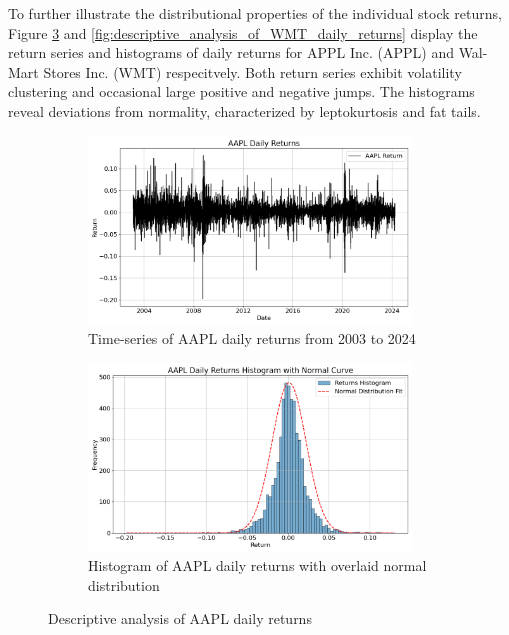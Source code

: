 To further illustrate the distributional properties of the individual stock returns, Figure \ref{fig:descriptive_analysis_of_AAPL_daily_returns} and \ref{fig:descriptive_analysis_of_WMT_daily_returns} display the return series and histograms of daily returns for APPL Inc. (APPL) and Wal-Mart Stores Inc. (WMT) respecitvely. Both return series exhibit volatility clustering and occasional large positive and negative jumps. The histograms reveal deviations from normality, characterized by leptokurtosis and fat tails.

\begin{figure}[H]
    \centering
    \begin{subfigure}[b]{0.49\textwidth}
        \centering
        \includegraphics[width=\linewidth, height=5cm]{Images/Data/descriptive_statistics_AAPL_daily_return_plot.png}
        \caption{Time-series of AAPL daily returns from 2003 to 2024}
        \label{fig:descriptive_statistics_AAPL_daily_return_plot}
    \end{subfigure}
    \hfill
    \begin{subfigure}[b]{0.49\textwidth}
        \centering
        \includegraphics[width=\linewidth, height=5cm]{Images/Data/descriptive_statistics_AAPL_daily_return_histogram.png}
        \caption{Histogram of AAPL daily returns with overlaid normal distribution}
        \label{fig:descriptive_statistics_AAPL_daily_return_histogram}
    \end{subfigure}
    \caption{Descriptive analysis of AAPL daily returns}
    \label{fig:descriptive_analysis_of_AAPL_daily_returns}
\end{figure}

